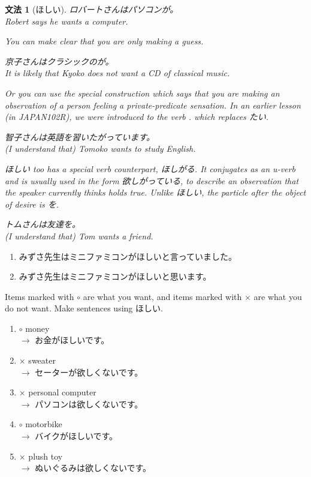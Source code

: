 \documentclass[notoc,notitlepage]{tufte-book}
\newtheorem{grammar}{\faBook \enspace 文法}[section]
\begin{document}
\begin{grammar}[ほしい]
  ロバートさんはパソコンが。 \\
  Robert says he wants a computer.

  \noindent You can make clear that you are only making a guess.

  京子さんはクラシックのが。\\
  It is likely that Kyoko does not want a CD of classical music.

  \noindent Or you can use the special construction which says that you are making an observation of a person feeling a private-predicate sensation. In an earlier lesson (in JAPAN102R), we were introduced to the verb . which replaces たい.

  智子さんは英語を習いたがっています。\\
  (I understand that) Tomoko wants to study English.

  \noindent ほしい too has a special verb counterpart, ほしがる. It conjugates as an \textit{u}-verb and is usually used in the form 欲しがっている, to describe an observation that the speaker currently thinks holds true. Unlike ほしい, the particle after the object of desire is を.

  トムさんは友達を。\\
  (I understand that) Tom wants a friend.
\end{grammar}

\begin{eg}
  \begin{enumerate}
    \item みずさ先生はミニファミコンがほしいと言っていました。
    \item みずさ先生はミニファミコンがほしいと思います。
  \end{enumerate}
\end{eg}

\begin{ex}
  Items marked with $\circ$ are what you want, and items marked with $\times$ are what you do not want. Make sentences using ほしい.

  \begin{enumerate}
    \item $\circ$ money \\
      $\to$ お金がほしいです。
    \item $\times$ sweater \\
      $\to$ セーターが欲しくないです。
    \item $\times$ personal computer \\
      $\to$ パソコンは欲しくないです。
    \item $\circ$ motorbike \\
      $\to$ バイクがほしいです。
    \item $\times$ plush toy \\
      $\to$ ぬいぐるみは欲しくないです。
  \end{enumerate}
\end{ex}
\end{document}

